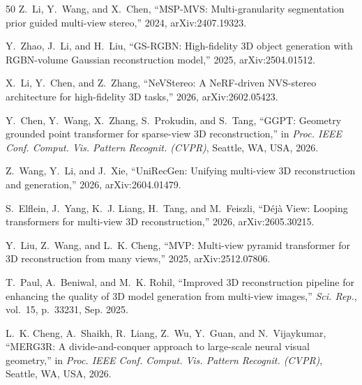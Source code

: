 \documentclass[journal]{IEEEtran}
\begin{document}
\begin{thebibliography}{50}
 Z.~Li, Y.~Wang, and X.~Chen, ``MSP-MVS: Multi-granularity segmentation prior guided multi-view stereo,'' 2024, arXiv:2407.19323.

 Y.~Zhao, J.~Li, and H.~Liu, ``GS-RGBN: High-fidelity 3D object generation with RGBN-volume Gaussian reconstruction model,'' 2025, arXiv:2504.01512.

 X.~Li, Y.~Chen, and Z.~Zhang, ``NeVStereo: A NeRF-driven NVS-stereo architecture for high-fidelity 3D tasks,'' 2026, arXiv:2602.05423.

 Y.~Chen, Y.~Wang, X.~Zhang, S.~Prokudin, and S.~Tang, ``GGPT: Geometry grounded point transformer for sparse-view 3D reconstruction,'' in \textit{Proc. IEEE Conf. Comput. Vis. Pattern Recognit. (CVPR)}, Seattle, WA, USA, 2026.

 Z.~Wang, Y.~Li, and J.~Xie, ``UniRecGen: Unifying multi-view 3D reconstruction and generation,'' 2026, arXiv:2604.01479.

 S.~Elflein, J.~Yang, K.~J. Liang, H.~Tang, and M.~Feiszli, ``D\'ej\`a View: Looping transformers for multi-view 3D reconstruction,'' 2026, arXiv:2605.30215.

 Y.~Liu, Z.~Wang, and L.~K. Cheng, ``MVP: Multi-view pyramid transformer for 3D reconstruction from many views,'' 2025, arXiv:2512.07806.

 T.~Paul, A.~Beniwal, and M.~K. Rohil, ``Improved 3D reconstruction pipeline for enhancing the quality of 3D model generation from multi-view images,'' \textit{Sci. Rep.}, vol.~15, p.~33231, Sep. 2025.

 L.~K. Cheng, A.~Shaikh, R.~Liang, Z.~Wu, Y.~Guan, and N.~Vijaykumar, ``MERG3R: A divide-and-conquer approach to large-scale neural visual geometry,'' in \textit{Proc. IEEE Conf. Comput. Vis. Pattern Recognit. (CVPR)}, Seattle, WA, USA, 2026.

\end{thebibliography}
\end{document}
